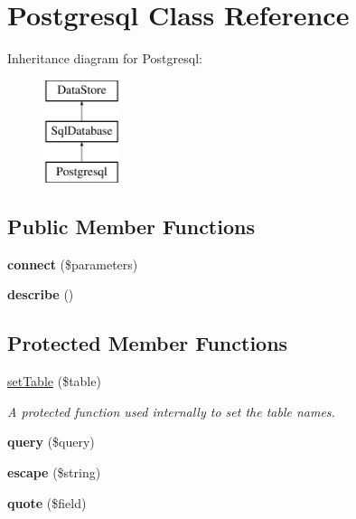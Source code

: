 \hypertarget{class_postgresql}{
\section{Postgresql Class Reference}
\label{class_postgresql}
}
Inheritance diagram for Postgresql:\begin{figure}[H]
\begin{center}
\leavevmode
\includegraphics[height=3.000000cm]{class_postgresql}
\end{center}
\end{figure}
\subsection*{Public Member Functions}
\begin{DoxyCompactItemize}
\item 
\hypertarget{class_postgresql_ad1330238ab6052e9b2e39bdf6ef8d1a5}{
{\bfseries connect} (\$parameters)}
\label{class_postgresql_ad1330238ab6052e9b2e39bdf6ef8d1a5}

\item 
\hypertarget{class_postgresql_a3a1b0563c0cace2acb354763603913bc}{
{\bfseries describe} ()}
\label{class_postgresql_a3a1b0563c0cace2acb354763603913bc}

\end{DoxyCompactItemize}
\subsection*{Protected Member Functions}
\begin{DoxyCompactItemize}
\item 
\hyperlink{class_postgresql_a1722d9fd690b3cc3247ddc684f87557e}{setTable} (\$table)
\begin{DoxyCompactList}\small\item\em A protected function used internally to set the table names. \item\end{DoxyCompactList}\item 
\hypertarget{class_postgresql_adfbdbd6335ece38f952aa94ef156c8df}{
{\bfseries query} (\$query)}
\label{class_postgresql_adfbdbd6335ece38f952aa94ef156c8df}

\item 
\hypertarget{class_postgresql_af46b7259f6efb9dc57202be05cf2320c}{
{\bfseries escape} (\$string)}
\label{class_postgresql_af46b7259f6efb9dc57202be05cf2320c}

\item 
\hypertarget{class_postgresql_a443b163e803316c852044e9660ab28a5}{
{\bfseries quote} (\$field)}
\label{class_postgresql_a443b163e803316c852044e9660ab28a5}

\end{DoxyCompactItemize}


